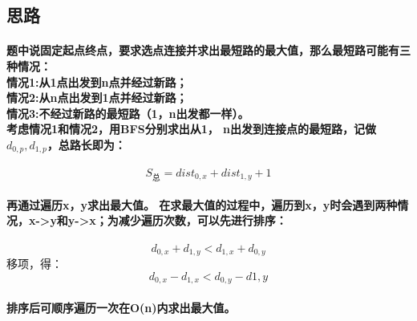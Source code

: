 \documentclass[cyan,pad,cn]{elegantnote}
\begin{document}
\subsection{思路}
\paragraph{
    题中说固定起点终点，要求选点连接并求出最短路的最大值，那么最短路可能有三种情况：
    \\情况1:从1点出发到n点并经过新路；
    \\情况2:从n点出发到1点并经过新路；
    \\情况3:不经过新路的最短路（1，n出发都一样）。
    \\考虑情况1和情况2，用BFS分别求出从1，
    n出发到连接点的最短路，记做
    \(d_{0,p},d_{1,p}\)，总路长即为：
    }
    \begin{equation}
    S_{总}=dist_{0,x}+dist_{1,y}+1
    \end{equation}
\paragraph{
        再通过遍历x，y求出最大值。
        在求最大值的过程中，遍历到x，y时会遇到两种情况，x->y和y->x；为减少遍历次数，可以先进行排序：
}

\begin{equation}
    d_{0,x}+d_{1,y}<d_{1,x}+d_{0,y}
\end{equation}
{移项，得：}
\begin{equation}
d_{0,x}-d_{1,x}<d_{0,y}-d{1,y}
\end{equation}

\paragraph{
    排序后可顺序遍历一次在O(n)内求出最大值。
}
\end{document}
